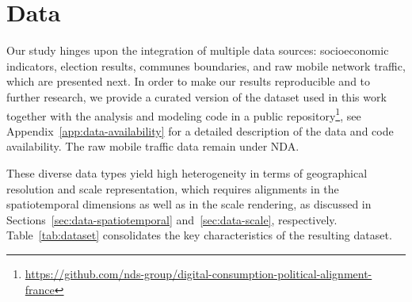 \documentclass[9pt,sigconf,letterpaper]{acmart}
\begin{document}
\section{Data}
\label{sec:data}

Our study hinges upon the integration of multiple data sources:  socioeconomic indicators, election results, communes boundaries, and raw mobile network traffic, which are presented next.
In order to make our results reproducible and to further research, we provide a curated version of the dataset used in this work together with the analysis and modeling code in a public repository\footnote{\href{https://github.com/nds-group/digital-consumption-political-alignment-france}{https://github.com/nds-group/digital-consumption-political-alignment-france}}, see Appendix~\ref{app:data-availability} for a detailed description of the data and code availability.
The raw mobile traffic data remain under \ac{NDA}.

These diverse data types yield high heterogeneity in terms of geographical resolution and scale representation, which requires alignments in the spatiotemporal dimensions as well as in the scale rendering, as discussed in Sections~\ref{sec:data-spatiotemporal} and~\ref{sec:data-scale}, respectively.
Table~\ref{tab:dataset} consolidates the key characteristics of the resulting dataset.
\end{document}
